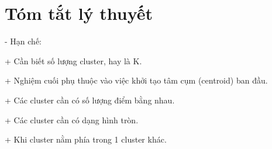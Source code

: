 \section{Tóm tắt lý thuyết}

- Hạn chế:

+ Cần biết số lượng cluster, hay là K.

+ Nghiệm cuối phụ thuộc vào việc khởi tạo tâm cụm (centroid) ban đầu.

+ Các cluster cần có số lượng điểm bằng nhau.

+ Các cluster cần có dạng hình tròn.

+ Khi cluster nằm phía trong 1 cluster khác.
